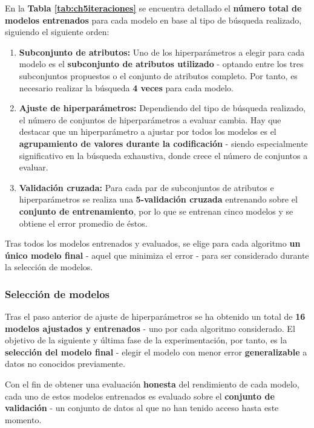 En la \textbf{Tabla \ref{tab:ch5iteraciones}} se encuentra detallado el \textbf{número total de modelos entrenados} para cada modelo en base al tipo de búsqueda realizado, siguiendo el siguiente orden:
\begin{enumerate}[parsep=2pt, itemsep=2pt, topsep=4pt]
	\item \textbf{Subconjunto de atributos:} Uno de los hiperparámetros a elegir para cada modelo es el \textbf{subconjunto de atributos utilizado} - optando entre los tres subconjuntos propuestos o el conjunto de atributos completo. Por tanto, es necesario realizar la búsqueda \textbf{4 veces} para cada modelo.
	\item \textbf{Ajuste de hiperparámetros:} Dependiendo del tipo de búsqueda realizado, el número de conjuntos de hiperparámetros a evaluar cambia. Hay que destacar que un hiperparámetro a ajustar por todos los modelos es el \textbf{agrupamiento de valores durante la codificación} - siendo especialmente significativo en la búsqueda exhaustiva, donde crece el número de conjuntos a evaluar.
	\item \textbf{Validación cruzada:} Para cada par de subconjuntos de atributos e hiperparámetros se realiza una \textbf{5-validación cruzada} entrenando sobre el \textbf{conjunto de entrenamiento}, por lo que se entrenan cinco modelos y se obtiene el error promedio de éstos.
\end{enumerate}

Tras todos los modelos entrenados y evaluados, se elige para cada algoritmo \textbf{un único modelo final} - aquel que minimiza el error - para ser considerado durante la selección de modelos.

\subsubsection{Selección de modelos}

Tras el paso anterior de ajuste de hiperparámetros se ha obtenido un total de \textbf{16 modelos ajustados y entrenados} - uno por cada algoritmo considerado. El objetivo de la siguiente y última fase de la experimentación, por tanto, es la \textbf{selección del modelo final} - elegir el modelo con menor error \textbf{generalizable} a datos no conocidos previamente.

Con el fin de obtener una evaluación \textbf{honesta} del rendimiento de cada modelo, cada uno de estos modelos entrenados es evaluado sobre el \textbf{conjunto de validación} - un conjunto de datos al que no han tenido acceso hasta este momento.

